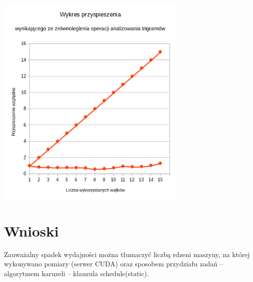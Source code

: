 \documentclass[a4paper,12pt]{article}
\begin{document}
\begin{center}
\includegraphics[width=0.7\textwidth]{data/przyspieszenie_2.png}
\end{center}

\section*{Wnioski}
Zauważalny spadek wydajności można tłumaczyć liczbą rdzeni maszyny, na której wykonywano pomiary (serwer CUDA) oraz sposobem przydziału zadań – algorytmem karuzeli – klauzula schedule(static).
\end{document}
